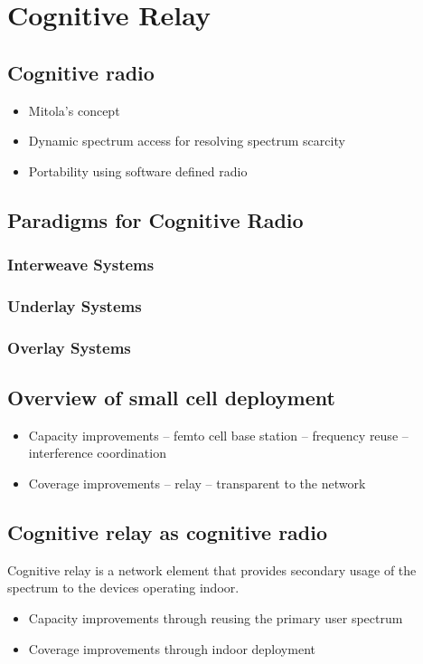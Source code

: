 \chapter{Cognitive Relay}
\label{chap:wav}

\section{Cognitive radio}
\begin{itemize}
\item Mitola's concept
\item Dynamic spectrum access for resolving spectrum scarcity
\item Portability using software defined radio
\end{itemize}

\section{Paradigms for Cognitive Radio}
\subsection{Interweave Systems}
\subsection{Underlay Systems}
\subsection{Overlay Systems}

\section{Overview of small cell deployment}
\begin{itemize}
\item Capacity improvements -- femto cell base station -- frequency reuse -- interference coordination 
\item Coverage improvements -- relay -- transparent to the network
\end{itemize}

\section{Cognitive relay as cognitive radio}
Cognitive relay is a network element that provides secondary usage of the spectrum to the devices operating indoor.
\begin{itemize}
\item Capacity improvements through reusing the primary user spectrum
\item Coverage improvements through indoor deployment
\end{itemize}

